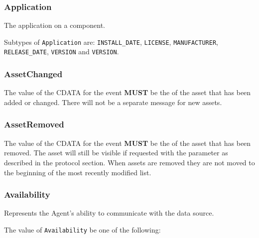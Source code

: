 \subsubsection{Application}
  \label{sec:Application}



The application on a component.



Subtypes of \texttt{Application} are: \texttt{INSTALL_DATE}, \texttt{LICENSE}, \texttt{MANUFACTURER}, \texttt{RELEASE_DATE}, \texttt{VERSION} and \texttt{VERSION}. 
\FloatBarrier

\subsubsection{AssetChanged}
  \label{sec:AssetChanged}



The value of the \gls{CDATA} for the event \textbf{MUST} be the  of the asset that has been added or changed. There will not be a separate message for new assets.

\FloatBarrier

\subsubsection{AssetRemoved}
  \label{sec:AssetRemoved}



The value of the \gls{CDATA} for the event \textbf{MUST} be the  of the asset that has been removed. The asset will still be visible if requested with the  parameter as described in the protocol section. When assets are removed they are not moved to the beginning of the most recently modified list.

\FloatBarrier

\subsubsection{Availability}
  \label{sec:Availability}



Represents the \gls{Agent}'s ability to communicate with the data source.


The value of \texttt{Availability} \MUST be one of the following: 

